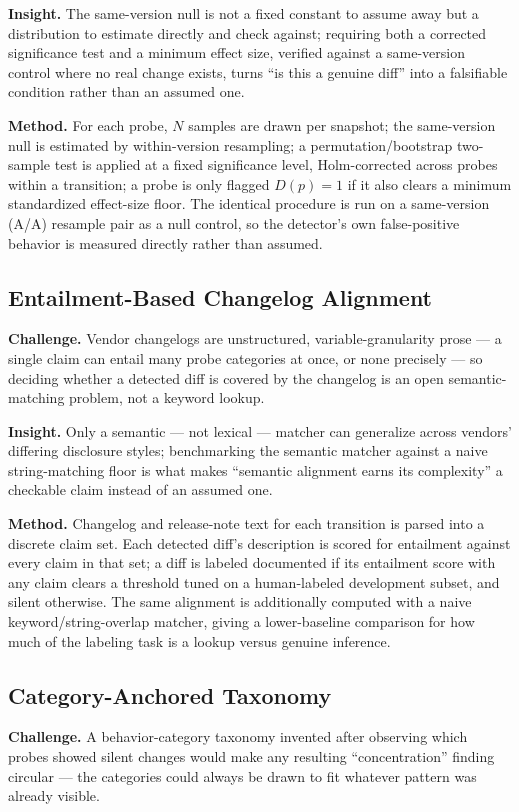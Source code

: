 \documentclass[11pt]{article}
\begin{document}
\textbf{Insight.} The same-version null is not a fixed constant to assume away but a distribution to estimate directly and check against; requiring both a corrected significance test and a minimum effect size, verified against a same-version control where no real change exists, turns ``is this a genuine diff'' into a falsifiable condition rather than an assumed one.

\textbf{Method.} For each probe, $N$ samples are drawn per snapshot; the same-version null is estimated by within-version resampling; a permutation/bootstrap two-sample test is applied at a fixed significance level, Holm-corrected across probes within a transition; a probe is only flagged $D(p)=1$ if it also clears a minimum standardized effect-size floor. The identical procedure is run on a same-version (A/A) resample pair as a null control, so the detector's own false-positive behavior is measured directly rather than assumed.

\subsection{Entailment-Based Changelog Alignment}
\textbf{Challenge.} Vendor changelogs are unstructured, variable-granularity prose --- a single claim can entail many probe categories at once, or none precisely --- so deciding whether a detected diff is covered by the changelog is an open semantic-matching problem, not a keyword lookup.

\textbf{Insight.} Only a semantic --- not lexical --- matcher can generalize across vendors' differing disclosure styles; benchmarking the semantic matcher against a naive string-matching floor is what makes ``semantic alignment earns its complexity'' a checkable claim instead of an assumed one.

\textbf{Method.} Changelog and release-note text for each transition is parsed into a discrete claim set. Each detected diff's description is scored for entailment against every claim in that set; a diff is labeled documented if its entailment score with any claim clears a threshold tuned on a human-labeled development subset, and silent otherwise. The same alignment is additionally computed with a naive keyword/string-overlap matcher, giving a lower-baseline comparison for how much of the labeling task is a lookup versus genuine inference.

\subsection{Category-Anchored Taxonomy}
\textbf{Challenge.} A behavior-category taxonomy invented after observing which probes showed silent changes would make any resulting ``concentration'' finding circular --- the categories could always be drawn to fit whatever pattern was already visible.
\end{document}
